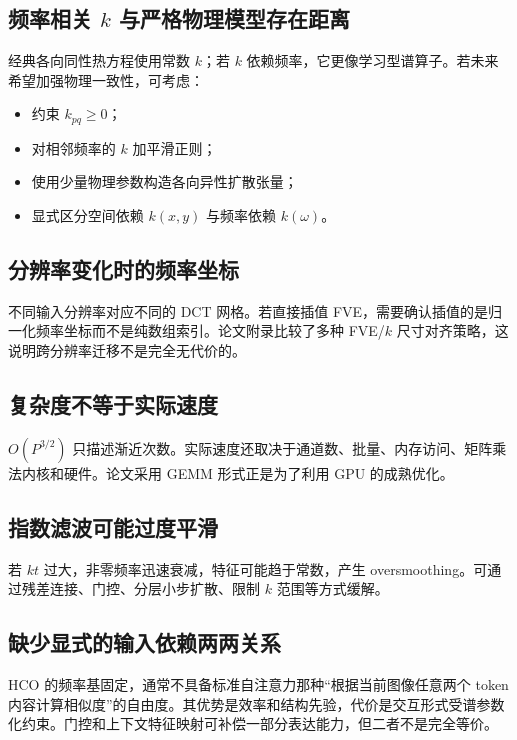 \documentclass[UTF8,12pt,a4paper,fontset=none]{ctexart}
\numberwithin{equation}{section}
\begin{document}
\subsection{频率相关 \texorpdfstring{$k$}{k} 与严格物理模型存在距离}

经典各向同性热方程使用常数 $k$；若 $k$ 依赖频率，它更像学习型谱算子。若未来希望加强物理一致性，可考虑：
\begin{itemize}[leftmargin=2.2em]
  \item 约束 $k_{pq}\ge0$；
  \item 对相邻频率的 $k$ 加平滑正则；
  \item 使用少量物理参数构造各向异性扩散张量；
  \item 显式区分空间依赖 $k(x,y)$ 与频率依赖 $k(\omega)$。
\end{itemize}

\subsection{分辨率变化时的频率坐标}

不同输入分辨率对应不同的 DCT 网格。若直接插值 FVE，需要确认插值的是归一化频率坐标而不是纯数组索引。论文附录比较了多种 FVE/$k$ 尺寸对齐策略，这说明跨分辨率迁移不是完全无代价的。

\subsection{复杂度不等于实际速度}

$O(P^{3/2})$ 只描述渐近次数。实际速度还取决于通道数、批量、内存访问、矩阵乘法内核和硬件。论文采用 GEMM 形式正是为了利用 GPU 的成熟优化。

\subsection{指数滤波可能过度平滑}

若 $kt$ 过大，非零频率迅速衰减，特征可能趋于常数，产生 oversmoothing。可通过残差连接、门控、分层小步扩散、限制 $k$ 范围等方式缓解。

\subsection{缺少显式的输入依赖两两关系}

HCO 的频率基固定，通常不具备标准自注意力那种“根据当前图像任意两个 token 内容计算相似度”的自由度。其优势是效率和结构先验，代价是交互形式受谱参数化约束。门控和上下文特征映射可补偿一部分表达能力，但二者不是完全等价。
\end{document}
